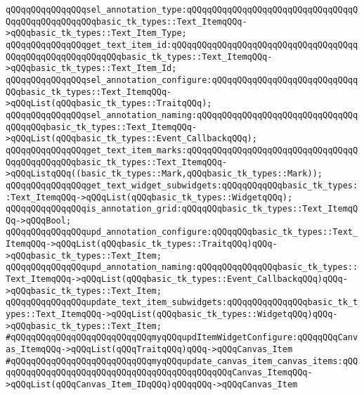 \newline
\newline
\verb|qQQqqQQqqQQqqQQqsel_annotation_type:qQQqqQQqqQQqqQQqqQQqqQQqqQQqqQQqqQQqqQQqqQQqqQQqqQQqbasic_tk_types::Text_ItemqQQq->qQQqbasic_tk_types::Text_Item_Type;|\newline
\verb|qQQqqQQqqQQqqQQqget_text_item_id:qQQqqQQqqQQqqQQqqQQqqQQqqQQqqQQqqQQqqQQqqQQqqQQqqQQqqQQqqQQqbasic_tk_types::Text_ItemqQQq->qQQqbasic_tk_types::Text_Item_Id;|\newline
\verb|qQQqqQQqqQQqqQQqsel_annotation_configure:qQQqqQQqqQQqqQQqqQQqqQQqqQQqqQQqbasic_tk_types::Text_ItemqQQq->qQQqList(qQQqbasic_tk_types::TraitqQQq);|\newline
\verb|qQQqqQQqqQQqqQQqsel_annotation_naming:qQQqqQQqqQQqqQQqqQQqqQQqqQQqqQQqqQQqqQQqbasic_tk_types::Text_ItemqQQq->qQQqList(qQQqbasic_tk_types::Event_CallbackqQQq);|\newline
\verb|qQQqqQQqqQQqqQQqget_text_item_marks:qQQqqQQqqQQqqQQqqQQqqQQqqQQqqQQqqQQqqQQqqQQqqQQqbasic_tk_types::Text_ItemqQQq->qQQqListqQQq((basic_tk_types::Mark,qQQqbasic_tk_types::Mark));|\newline
\verb|qQQqqQQqqQQqqQQqget_text_widget_subwidgets:qQQqqQQqqQQqbasic_tk_types::Text_ItemqQQq->qQQqList(qQQqbasic_tk_types::WidgetqQQq);|\newline
\newline
\verb|qQQqqQQqqQQqqQQqis_annotation_grid:qQQqqQQqbasic_tk_types::Text_ItemqQQq->qQQqBool;|\newline
\newline
\verb|qQQqqQQqqQQqqQQqupd_annotation_configure:qQQqqQQqbasic_tk_types::Text_ItemqQQq->qQQqList(qQQqbasic_tk_types::TraitqQQq)qQQq->qQQqbasic_tk_types::Text_Item;|\newline
\newline
\verb|qQQqqQQqqQQqqQQqupd_annotation_naming:qQQqqQQqqQQqqQQqbasic_tk_types::Text_ItemqQQq->qQQqList(qQQqbasic_tk_types::Event_CallbackqQQq)qQQq->qQQqbasic_tk_types::Text_Item;|\newline
\newline
\verb|qQQqqQQqqQQqqQQqupdate_text_item_subwidgets:qQQqqQQqqQQqqQQqbasic_tk_types::Text_ItemqQQq->qQQqList(qQQqbasic_tk_types::WidgetqQQq)qQQq->qQQqbasic_tk_types::Text_Item;|\newline
\newline
\verb|#qQQqqQQqqQQqqQQqqQQqqQQqqQQqmyqQQqupdItemWidgetConfigure:qQQqqQQqCanvas_ItemqQQq->qQQqList(qQQqTraitqQQq)qQQq->qQQqCanvas_Item|\newline
\verb|#qQQqqQQqqQQqqQQqqQQqqQQqqQQqmyqQQqupdate_canvas_item_canvas_items:qQQqqQQqqQQqqQQqqQQqqQQqqQQqqQQqqQQqqQQqqQQqqQQqCanvas_ItemqQQq->qQQqList(qQQqCanvas_Item_IDqQQq)qQQqqQQq->qQQqCanvas_Item|\newline
